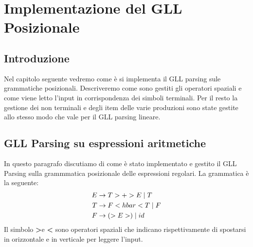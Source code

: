 \chapter{Implementazione del GLL Posizionale}
\section{Introduzione}
Nel capitolo seguente vedremo come è si implementa il GLL parsing sule grammatiche posizionali. Descriveremo come sono gestiti gli operatori spaziali e come viene letto l'input in corrispondenza dei simboli terminali. Per il resto la gestione dei non terminali e degli item delle varie produzioni sono state gestite allo stesso modo che vale per il GLL parsing lineare.
\section{GLL Parsing su espressioni aritmetiche}
In questo paragrafo discutiamo di come è stato implementato e gestito il GLL Parsing sulla grammmatica posizionale delle espressioni regolari. La grammatica è la seguente:
\begin{align}\label{gramPos1}
E & \to T > + > E \mid  T \notag \\
T & \to F < hbar < T \mid F \notag \\
F & \to ( > E > ) \mid id 
\end{align}
Il simbolo \textbf{>}e \textbf{<} sono operatori spaziali che indicano rispettivamente di spostarsi in orizzontale e in verticale per leggere l'input.
